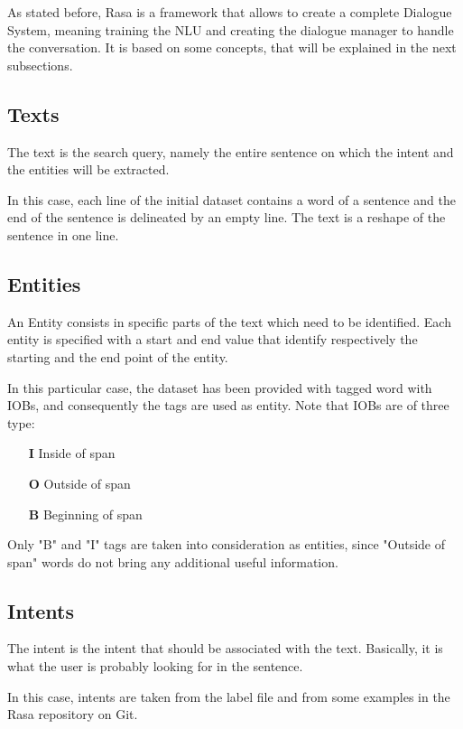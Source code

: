 \documentclass[11pt,a4paper]{article}
\begin{document}
As stated before, Rasa is a framework that allows to create a complete Dialogue System, meaning training the NLU and creating the dialogue manager to handle the conversation. It is based on some concepts, that will be explained in the next subsections.

	\subsection{Texts}
	
	The text is the search query, namely the entire sentence on which the intent and the entities will be extracted.
	
	In this case, each line of the initial dataset contains a word of a sentence and the end of the sentence is delineated by an empty line. The text is a reshape of the sentence in one line.

	\subsection{Entities}
	\label{entities}
	
	An Entity consists in specific parts of the text which need to be identified. Each entity is specified with a start and end value that identify respectively the starting and the end point of the entity.
	
	In this particular case, the dataset has been provided with tagged word with IOBs, and consequently the tags are used as entity. Note that IOBs are of three type:
	\begin{itemize}
		\item [{\bfseries I}] Inside of span
		\item [{\bfseries O}] Outside of span
		\item [{\bfseries B}] Beginning of span
	\end{itemize}
	
	Only "B" and "I" tags are taken into consideration as entities, since "Outside of span" words do not bring any additional useful information. 
	
	\subsection{Intents}
	\label{intents}
	
	The intent is the intent that should be associated with the text. Basically, it is what the user is probably looking for in the sentence. 
	
	In this case, intents are taken from the label file and from some examples in the Rasa repository on Git.
\end{document}
